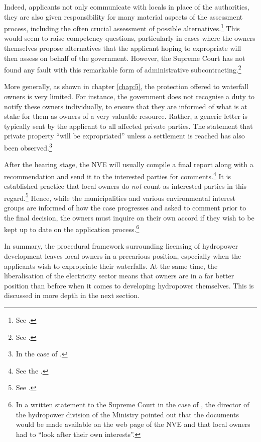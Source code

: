 Indeed, applicants not only communicate with locals in place of the authorities, they are also given responsibility for many material aspects of the assessment process, including the often crucial assessment of possible alternatives.\footnote{See \cite[24]{stokker10}.} This would seem to raise competency questions, particularly in cases where the owners themselves propose alternatives that the applicant hoping to expropriate will then assess on behalf of the government. However, the Supreme Court has not found any fault with this remarkable form of administrative subcontracting.\footnote{See \cite[51-55]{jorpeland11}.}

More generally, as shown in chapter \ref{chap:5}, the protection offered to waterfall owners is very limited. For instance, the government does not recognise a duty to notify these owners individually, to ensure that they are informed of what is at stake for them as owners of a very valuable resource. Rather, a generic letter is typically sent by the applicant to all affected private parties. The statement that private property ``will be expropriated'' unless a settlement is reached has also been observed.\footnote{In the case of \cite{sauda09}.}

After the hearing stage, the NVE will usually compile a final report along with a recommendation and send it to the interested parties for comments.\footnote{See the \dni\cite[6]{wra17}.} It is established practice that local owners do {\it not} count as interested parties in this regard.\footnote{See \cite[46]{jorpeland11}.} Hence, while the municipalities and various environmental interest groups are informed of how the case progresses and asked to comment prior to the final decision, the owners must inquire on their own accord if they wish to be kept up to date on the application process.\footnote{In a written statement to the Supreme Court in the case of \cite{jorpeland11}, the director of the hydropower division of the Ministry pointed out that the documents would be made available on the web page of the NVE and that local owners had to ``look after their own interests''.}

In summary, the procedural framework surrounding licensing of hydropower development leaves local owners in a precarious position, especially when the applicants wish to expropriate their waterfalls. At the same time, the liberalisation of the electricity sector means that owners are in a far better position than before when it comes to developing hydropower themselves. This is discussed in more depth in the next section.


